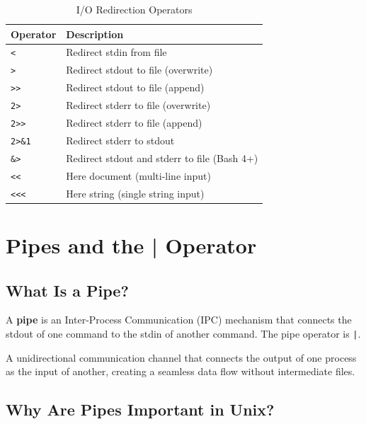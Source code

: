\begin{table}[htbp]
	\centering
	\caption{I/O Redirection Operators}
	\label{tab:io-operators}
	\begin{tabular}{@{}lp{10cm}@{}}
		\toprule
		\textbf{Operator} & \textbf{Description}                         \\
		\midrule
		\texttt{<}        & Redirect stdin from file                     \\
		\texttt{>}        & Redirect stdout to file (overwrite)          \\
		\verb|>>|         & Redirect stdout to file (append)             \\
		\texttt{2>}       & Redirect stderr to file (overwrite)          \\
		\verb|2>>|        & Redirect stderr to file (append)             \\
		\texttt{2>\&1}    & Redirect stderr to stdout                    \\
		\texttt{\&>}      & Redirect stdout and stderr to file (Bash 4+) \\
		\verb|<<|         & Here document (multi-line input)             \\
		\verb|<<<|        & Here string (single string input)            \\
		\bottomrule
	\end{tabular}
\end{table}

\section{Pipes and the | Operator}
\label{sec:pipes}

\subsection{What Is a Pipe?}

A \textbf{pipe} is an Inter-Process Communication (IPC) mechanism that connects the stdout of one command to the stdin of another command. The pipe operator is \texttt{|}.

\begin{definition}[Pipe]
	A unidirectional communication channel that connects the output of one process as the input of another, creating a seamless data flow without intermediate files.
\end{definition}

\subsection{Why Are Pipes Important in Unix?}

